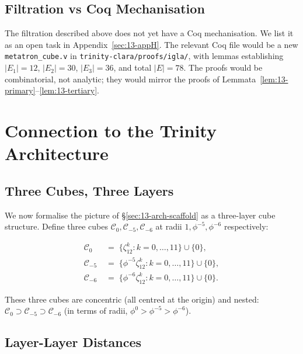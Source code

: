 \subsection{Filtration vs Coq Mechanisation}
\label{sec:13-filt-coq}

The filtration described above does not yet have a Coq
mechanisation. We list it as an open task in
Appendix~\ref{sec:13-appH}. The relevant Coq file would be a new
\verb|metatron_cube.v| in \verb|trinity-clara/proofs/igla/|, with
lemmas establishing $|E_{1}| = 12$, $|E_{2}| = 30$, $|E_{3}| =
36$, and total $|E| = 78$. The proofs would be combinatorial,
not analytic; they would mirror the proofs of
Lemmata~\ref{lem:13-primary}--\ref{lem:13-tertiary}.

\section{Connection to the Trinity Architecture}
\label{sec:13-arch}

\subsection{Three Cubes, Three Layers}
\label{sec:13-three-cubes}

We now formalise the picture of \S\ref{sec:13-arch-scaffold} as a
three-layer cube structure. Define three cubes
$\mathcal{C}_{0}, \mathcal{C}_{-5}, \mathcal{C}_{-6}$ at radii
$1, \phi^{-5}, \phi^{-6}$ respectively:

\begin{align}
  \mathcal{C}_{0}    &\;=\; \{ \zeta_{12}^{k} : k = 0, \ldots, 11 \}
                          \cup \{ 0 \},\\
  \mathcal{C}_{-5}   &\;=\; \{ \phi^{-5} \zeta_{12}^{k} :
                              k = 0, \ldots, 11 \} \cup \{ 0 \},\\
  \mathcal{C}_{-6}   &\;=\; \{ \phi^{-6} \zeta_{12}^{k} :
                              k = 0, \ldots, 11 \} \cup \{ 0 \}.
\end{align}

These three cubes are concentric (all centred at the origin) and
nested: $\mathcal{C}_{0} \supset \mathcal{C}_{-5} \supset
\mathcal{C}_{-6}$ (in terms of radii, $\phi^{0} > \phi^{-5} >
\phi^{-6}$).

\subsection{Layer-Layer Distances}
\label{sec:13-layer-distances}

